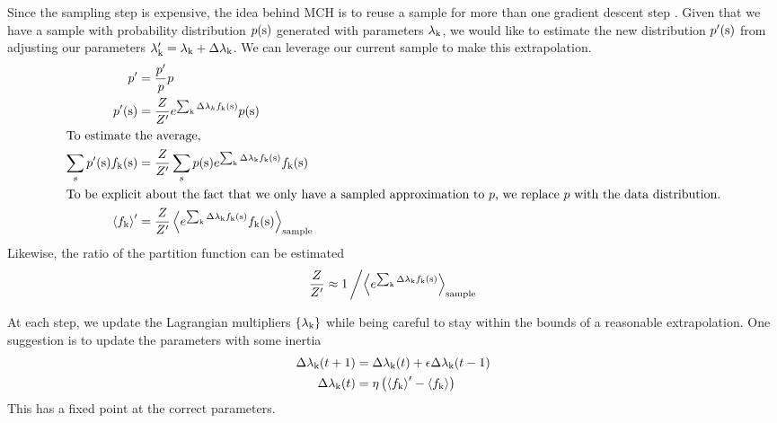 \documentclass[aps,prl,twocolumn,nofootinbib]{revtex4-1}
\begin{document}
Since the sampling step is expensive, the idea behind MCH is to reuse a sample for more than one gradient descent step \cite{Broderick:2007wq}. Given that we have a sample with probability distribution $p({\rm s})$ generated with parameters $\lambda_{\rm k}$, we would like to estimate the new distribution $p'({\rm s})$ from adjusting our parameters $\lambda_{\rm k}' = \lambda_{\rm k}+\Delta\lambda_{\rm k}$. We can leverage our current sample to make this extrapolation.
\begin{align}
	p' &= \frac{p'}{p}p\\
	p'({\rm s})	&= \frac{Z}{Z'}e^{\sum_{\rm k} \Delta\lambda_k f_{\rm k}({\rm s})} p({\rm s})\\
\intertext{To estimate the average,}
	\sum_s p'({\rm s}) f_{\rm k}({\rm s}) &= \frac{Z}{Z'} \sum_s p({\rm s}) e^{\sum_{\rm k} \Delta\lambda_{\rm k} f_{\rm k}({\rm s})} f_{\rm k}({\rm s})\\
\intertext{To be explicit about the fact that we only have a sampled approximation to $p$, we replace $p$ with the data distribution.}
	\left<f_{\rm k}\right>' &= \frac{Z}{Z'} \left<e^{\sum_{\rm k} \Delta\lambda_{\rm k} f_{\rm k}({\rm s})} f_{\rm k}({\rm s})\right>_{\rm sample}
\end{align}
Likewise, the ratio of the partition function can be estimated
\begin{align}
	\frac{Z}{Z'} \approx 1\left/\left<e^{\sum_{\rm k} \Delta\lambda_{\rm k} f_{\rm k}({\rm s})}\right>_{\rm sample}\right.
\end{align}

At each step, we update the Lagrangian multipliers $\{\lambda_{\rm k}\}$ while being careful to stay within the bounds of a reasonable extrapolation. One suggestion is to update the parameters with some inertia
\begin{align}
	\Delta\lambda_{\rm k}(t+1) &= \Delta \lambda_{\rm k}(t) + \epsilon \Delta\lambda_{\rm k}(t-1)\label{eq:mch learn1}\\
	\Delta \lambda_{\rm k}(t) &= \eta\left(\left<f_{\rm k}\right>'-\left<f_{\rm k}\right>\right)\label{eq:mch learn2}
\end{align}
This has a fixed point at the correct parameters.
\end{document}
